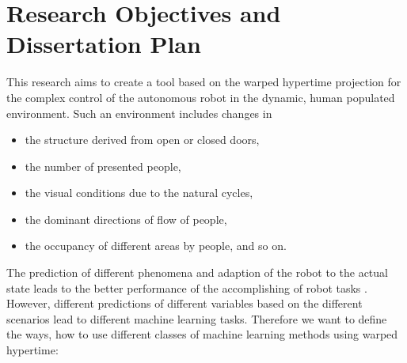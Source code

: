 \section{Research Objectives and Dissertation Plan}

This research aims to create a tool based on the warped hypertime projection for the complex control of the autonomous robot in the dynamic, human populated environment.
Such an environment includes changes in 
\begin{itemize}
    \item the structure derived from open or closed doors,
    \item the number of presented people,
    \item the visual conditions due to the natural cycles,
    \item the dominant directions of flow of people,
    \item the occupancy of different areas by people, and so on.
\end{itemize}
The prediction of different phenomena and adaption of the robot to the actual state leads to the better performance of the accomplishing of robot tasks \cite{hawes2017strands}.
However, different predictions of different variables based on the different scenarios lead to different machine learning tasks.
Therefore we want to define the ways, how to use different classes of machine learning methods using warped hypertime:
